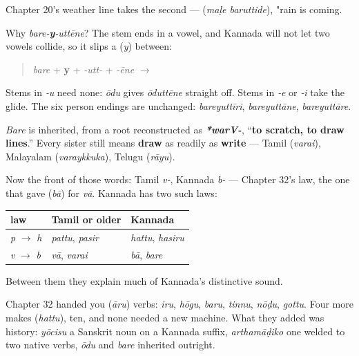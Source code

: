 Chapter 20's weather line takes the second — \textbf{ } (\emph{maḷe baruttide}), "rain is coming.

\begin{grammarlens}[title={Grammar Lens: the glide a vowel-final stem needs}]
Why \emph{bare‑\textbf{y}‑uttēne}? The stem ends in a vowel, and Kannada will not let two vowels collide, so it slips a \textbf{} (\emph{y}) between:

\begin{quote}
\emph{bare} + \textbf{y} + \emph{-utt-} + \emph{-ēne} $\to$ \textbf{}
\end{quote}

Stems in \emph{‑u} need none: \emph{ōdu} gives \emph{ōduttēne} straight off. Stems in \emph{‑e} or \emph{‑i} take the glide. The six person endings are unchanged: \emph{bareyuttīri}, \emph{bareyuttāne}, \emph{bareyuttāre}.
\end{grammarlens}

\begin{cousinweb}
\emph{Bare} is inherited, from a root reconstructed as \emph{\textbf{*warV-}}, \textquotedblleft{}\textbf{to scratch, to draw lines}.\textquotedblright{} Every sister still means \textbf{draw} as readily as \textbf{write} — Tamil \textbf{} (\emph{varai}), Malayalam \textbf{} (\emph{varaykkuka}), Telugu \textbf{} (\emph{rāyu}).

Now the front of those words: Tamil \emph{v‑}, Kannada \emph{b‑} — Chapter 32's law, the one that gave \textbf{} (\emph{bā}) for \emph{vā}. Kannada has two such laws:

\noindent
\begin{tabularx}{\linewidth}{@{}>{\raggedright\arraybackslash}X>{\raggedright\arraybackslash}X>{\raggedright\arraybackslash}X@{}}
\toprule
\textbf{law} & \textbf{Tamil or older} & \textbf{Kannada} \\
\midrule
\emph{p} $\to$ \emph{h} & \emph{pattu}, \emph{pasir} & \emph{hattu}, \emph{hasiru} \\
\emph{v} $\to$ \emph{b} & \emph{vā}, \emph{varai} & \emph{bā}, \emph{bare} \\
\bottomrule
\end{tabularx}

Between them they explain much of Kannada's distinctive sound.
\end{cousinweb}

\begin{grammarlens}[title={What you've built: four more verbs, and ten in all}]
Chapter 32 handed you \textbf{} (\emph{āru}) verbs: \emph{iru}, \emph{hōgu}, \emph{baru}, \emph{tinnu}, \emph{nōḍu}, \emph{gottu}. Four more makes \textbf{} (\emph{hattu}), ten, and none needed a new machine. What they added was history: \emph{yōcisu} a Sanskrit noun on a Kannada suffix, \emph{arthamāḍiko} one welded to two native verbs, \emph{ōdu} and \emph{bare} inherited outright.
\end{grammarlens}

